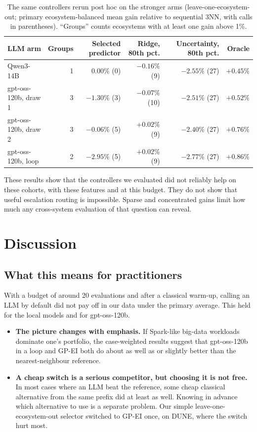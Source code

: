 \begin{table}[t]
\centering
\caption{The same controllers rerun post hoc on the stronger arms (leave-one-ecosystem-out; primary ecosystem-balanced mean gain relative to sequential 3NN, with calls in parentheses). ``Groups'' counts ecosystems with at least one gain above 1\%.}
\label{tab:routers-strong}
\small
\begin{tabular}{lrrrrr}
\toprule
LLM arm & Groups & Selected predictor & Ridge, 80th pct. & Uncertainty, 80th pct. & Oracle \\
\midrule
Qwen3-14B & 1 & $0.00\%$ (0) & $-0.16\%$ (9) & $-2.55\%$ (27) & $+0.45\%$ \\
gpt-oss-120b, draw 1 & 3 & $-1.30\%$ (3) & $-0.07\%$ (10) & $-2.51\%$ (27) & $+0.52\%$ \\
gpt-oss-120b, draw 2 & 3 & $-0.06\%$ (5) & $+0.02\%$ (9) & $-2.40\%$ (27) & $+0.76\%$ \\
gpt-oss-120b, loop & 2 & $-2.95\%$ (5) & $+0.02\%$ (9) & $-2.77\%$ (27) & $+0.86\%$ \\
\bottomrule
\end{tabular}
\end{table}

These results show that the controllers we evaluated did not reliably help on these cohorts, with these features and at this budget. They do not show that useful escalation routing is impossible. Sparse and concentrated gains limit how much any cross-system evaluation of that question can reveal.

\section{Discussion}

\subsection{What this means for practitioners}

With a budget of around 20 evaluations and after a classical warm-up, calling an LLM by default did not pay off in our data under the primary average. This held for the local models and for gpt-oss-120b.
\begin{itemize}
  \item \textbf{The picture changes with emphasis.} If Spark-like big-data workloads dominate one's portfolio, the case-weighted results suggest that gpt-oss-120b in a loop and GP-EI both do about as well as or slightly better than the nearest-neighbour reference.
  \item \textbf{A cheap switch is a serious competitor, but choosing it is not free.} In most cases where an LLM beat the reference, some cheap classical alternative from the same prefix did at least as well. Knowing in advance which alternative to use is a separate problem. Our simple leave-one-ecosystem-out selector switched to GP-EI once, on DUNE, where the switch hurt most.
\end{itemize}

